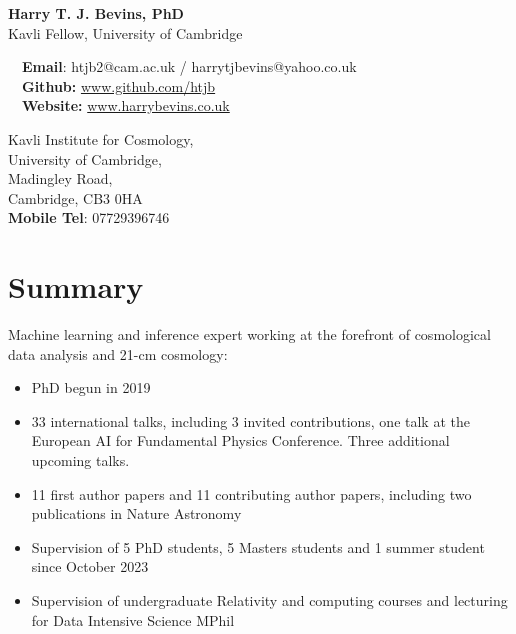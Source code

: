\documentclass{article}
\begin{document}
\small

\begin{center}
\Large
\textbf{{\color{blue}Harry T. J. Bevins, PhD}}\\
\large
Kavli Fellow, University of Cambridge
\end{center}

\begin{minipage}[ht]{0.6\linewidth}
	\faEnvelope~~\textbf{Email}: htjb2@cam.ac.uk / harrytjbevins@yahoo.co.uk\\
	\faGithub~~\textbf{Github:} \url{www.github.com/htjb}\\
	\faGlobe~~\textbf{Website:} \url{www.harrybevins.co.uk}
\end{minipage}
\begin{minipage}[ht]{0.3\linewidth}
	\begin{flushright}
	Kavli Institute for Cosmology, \\
    University of Cambridge,\\
    Madingley Road,\\
    Cambridge, CB3 0HA\\
    \textbf{Mobile Tel}: 07729396746 \\
	\end{flushright}
\end{minipage}

\section*{Summary}

\noindent Machine learning and inference expert working at the forefront of cosmological data analysis and 21-cm cosmology:
\begin{itemize}
    \item PhD begun in 2019
    \item  33 international talks, including 3 invited contributions, one talk at the European AI for Fundamental Physics Conference. Three additional upcoming talks.
    \item 11 first author papers and 11 contributing author papers, including two publications in Nature Astronomy
    \item Supervision of 5 PhD students, 5 Masters students and 1 summer student since October 2023
    \item Supervision of undergraduate Relativity and computing courses and lecturing for Data Intensive Science MPhil
    
\end{itemize}
\end{document}
